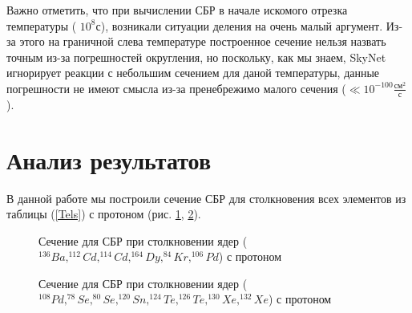 \documentclass[%
master,    %
natbib,      %
subf,        %
href,        %
colorlinks,  %
]{disser}
\begin{document}
Важно отметить, что при вычислении СБР в начале искомого отрезка температуры ($\text{~}10^8\text{с}$), возникали ситуации деления на очень малый аргумент. Из-за этого на граничной слева температуре построенное сечение нельзя назвать точным из-за погрешностей округления, но поскольку, как мы знаем, SkyNet игнорирует реакции с небольшим сечением для даной температуры, данные погрешности не имеют смысла из-за пренебрежимо малого сечения ($\ll 10^{-100} \frac{\text{см}^2}{\text{с}}$).

\section{Анализ результатов}
В данной работе мы построили сечение СБР для столкновения всех элементов из таблицы (\ref{Tels}) с протоном (рис. \ref{ris:sigma-full}, \ref{ris:sigma-full-2}).

\begin{figure}
 	\caption{Сечение для СБР при столкновении ядер ($^{136}Ba, ^{112}Cd, ^{114}Cd, ^{164}Dy, ^{84}Kr, ^{106}Pd$) с протоном}
 	\label{ris:sigma-full}
\end{figure}
\begin{figure}
	\caption{Сечение для СБР при столкновении ядер ($^{108}Pd, ^{78}Se, ^{80}Se, ^{120}Sn, ^{124}Te, ^{126}Te, ^{130}Xe, ^{132}Xe$) с протоном}
	\label{ris:sigma-full-2}
\end{figure}
\end{document}
